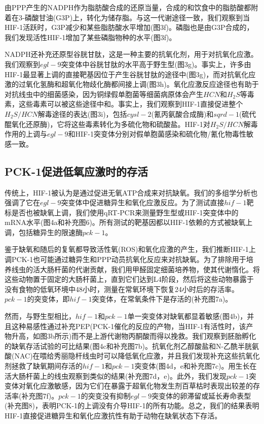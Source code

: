 \documentclass{ctexart}
\begin{document}
        由PPP产生的NADPH作为脂肪酸合成的还原当量，合成的和饮食中的脂肪酸都附着在3-磷酸甘油(G3P)上，转化为储存脂。与这一代谢途径一致，我们观察到当HIF-1活跃时，G3P减少和某些脂肪酸水平增加(图3f)。磷脂也是由G3P合成的，我们发现活性HIF-1增加了某些磷脂物种的水平(图3f)。

        NADPH还补充还原型谷胱甘肽，这是一种主要的抗氧化剂，用于对抗氧化应激。我们观察到$egl-9$突变体中谷胱甘肽的水平高于野生型(图3g)。事实上，许多由HIF-1最显著上调的直接靶基因位于产生谷胱甘肽的途径中(图3g)，而对抗氧化应激的过氧化氢酶和超氧化物歧化酶都间接上调(图3h)。氧化应激反应途径也有助于对抗线虫中的细菌感染，因为铜绿假单胞菌等细菌病原体会产生$HCN$和$H_{2}S$等毒素，这些毒素可以被这些途径中和。事实上，我们观察到HIF-1直接促进整个$H_{2}S/HCN$解毒途径的表达(图3i)，包括$cysl-2$(氰丙氨酸合成酶)和$sqrd-1$(硫代醌氧化还原酶)，它将这些毒素转化为多硫化物和硫酸盐。HIF-1对$H_{2}S/HCN$解毒作用的上调与$egl-9$和HIF-1突变体分别对假单胞菌感染和硫化物/氰化物毒性敏感一致。

    \subsection{PCK-1促进低氧应激时的存活}

        传统上，HIF-1被认为是通过促进无氧ATP合成来对抗缺氧。我们的多组学分析也强调了它在$egl-9$突变体中促进糖异生和氧化应激反应。为了测试直接$hif-1$靶标是否也被缺氧上调，我们使用qRT-PCR来测量野生型或HIF-1突变体中的mRNA水平(图4a和补充图6)。所有测试的靶基因都以HIF-1依赖的方式被缺氧上调，包括糖异生的限速酶$pck-1$。

        鉴于缺氧和随后的复氧都导致活性氧(ROS)和氧化应激的产生，我们推断HIF-1上调PCK-1也可能通过糖异生和PPP动员抗氧化反应来对抗缺氧。为了排除用于培养线虫的活大肠杆菌的代谢贡献，我们用甲醛固定细菌培养物，使其代谢惰化。将这些动物置于固定的大肠杆菌上，直到它们达到L4阶段，然后将这些动物暴露于没有食物的低氧环境中48小时，测量在常氧环境下恢复24小时后的存活率。$pck-1$的突变体，即$hif-1$突变体，在常氧条件下是存活的(补充图7a)。

        然而，与野生型相比，$hif-1$和$pck-1$单一突变体对缺氧都显着敏感(图4b)，并且这种易感性通过补充PEP(PCK-1催化的反应的产物，当HIF-1有活性时，该产物升高，如图3b所示)而不是上游代谢物丙酮酸而得以挽救。我们观察到胚胎孵化的缺氧存活试验的可比结果(图4c和补充图7b)。抗氧化剂乙醇酸盐和N-乙酰半胱氨酸(NAC)在喂给秀丽隐杆线虫时可以降低氧化应激，并且我们发现补充这些抗氧化剂拯救了缺氧期间存活的$hif-1$和$pck-1$突变体(图4d，e和补充图7c)。用生长在活大肠杆菌上的线虫观察到类似的结果(补充图7d，e)。此外，我们发现$pck-1$突变体对氧化应激敏感，因为它们在暴露于超氧化物发生剂百草枯时表现出较差的存活率(补充图7f)。$pck-1$的突变没有抑制$egl-9$突变体的卵滞留或延长寿命表型(补充图8)，表明PCK-1的上调没有介导HIF-1的所有功能。总之，我们的结果表明HIF-1直接促进糖异生和氧化应激抗性有助于动物在缺氧状态下存活。
\end{document}
